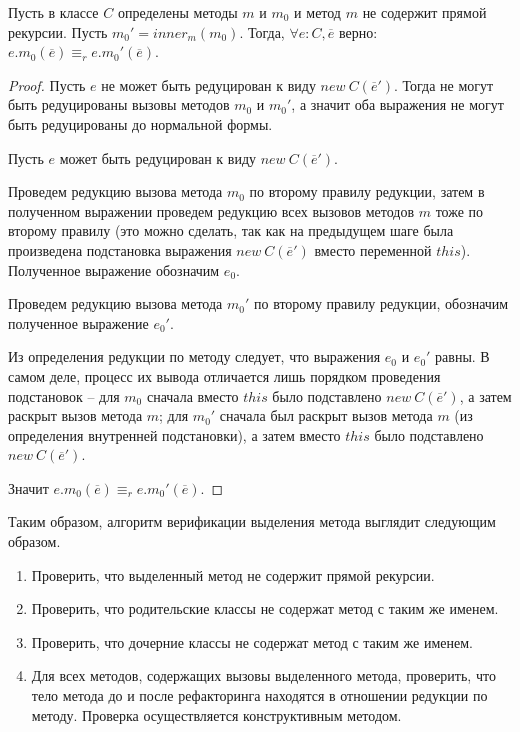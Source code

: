 \begin{theorem}
Пусть в классе $C$ определены методы $m$ и $m_0$ и метод $m$ не содержит прямой рекурсии. Пусть $m_0' = inner_m(m_0)$.
Тогда, $\forall e : C, \overline{e}$ верно: $e.m_0(\overline{e}) \equiv_r e.m_0'(\overline{e})$.
\end{theorem}
\begin{proof}
Пусть $e$ не может быть редуцирован к виду $new\ C(\overline{e}')$. Тогда не могут быть редуцированы вызовы методов $m_0$ и $m_0'$, а значит оба выражения не могут быть редуцированы до нормальной формы.

Пусть $e$ может быть редуцирован к виду $new\ C(\overline{e}')$.

Проведем редукцию вызова метода $m_0$ по второму правилу редукции, затем в полученном выражении проведем редукцию всех вызовов методов $m$ тоже по второму правилу
(это можно сделать, так как на предыдущем шаге была произведена подстановка выражения $new\ C(\overline{e}')$ вместо переменной $this$). Полученное выражение обозначим $e_0$.

Проведем редукцию вызова метода $m_0'$ по второму правилу редукции, обозначим полученное выражение $e_0'$.

Из определения редукции по методу следует, что выражения $e_0$ и $e_0'$ равны.
В самом деле, процесс их вывода отличается лишь порядком проведения подстановок -- для $m_0$ сначала вместо $this$ было подставлено $new\ C(\overline{e}')$, а затем раскрыт вызов метода $m$;
для $m_0'$ сначала был раскрыт вызов метода $m$ (из определения внутренней подстановки), а затем вместо $this$ было подставлено $new\ C(\overline{e}')$.

Значит $e.m_0(\overline{e}) \equiv_r e.m_0'(\overline{e})$.
\end{proof}

Таким образом, алгоритм верификации выделения метода выглядит следующим образом.
\begin{enumerate}
    \item Проверить, что выделенный метод не содержит прямой рекурсии.
    \item Проверить, что родительские классы не содержат метод с таким же именем.
    \item Проверить, что дочерние классы не содержат метод с таким же именем.
    \item Для всех методов, содержащих вызовы выделенного метода, проверить, что тело метода до и после рефакторинга находятся в отношении редукции по методу. Проверка осуществляется конструктивным методом.
\end{enumerate}

